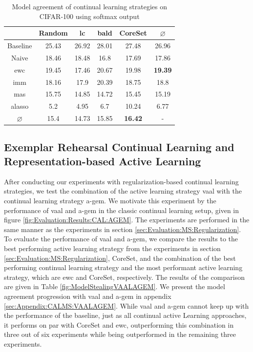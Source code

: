 \begin{table}[h]
    \centering
    \begin{tabular}{ c | c c c c | c } 
         & Random & \gls{lc} & \gls{bald} & CoreSet & $\varnothing$\\ 
        \hline
        Baseline & 25.43 & 26.92 & 28.01 & 27.48 & 26.96 \\
        \hline
        Naive & 18.46 & 18.48 & 16.8 & 17.69 & 17.86\\
        \gls{ewc} & 19.45 & 17.46 & 20.67 & 19.98 & \textbf{19.39}\\
        \gls{imm} & 18.16 & 17.9 & 20.39 & 18.75 & 18.8\\
        \gls{mas} & 15.75 & 14.85 & 14.72 & 15.45 & 15.19\\
        \gls{alasso} & 5.2 & 4.95 & 6.7 & 10.24 & 6.77\\
        \hline
        $\varnothing$ & 15.4 & 14.73 & 15.85 & \textbf{16.42} & -\\
    \end{tabular}
    \caption{Model agreement of continual learning strategies on CIFAR-100 using softmax output}
    \label{fig:ModelStealingCIFAR100Softmax}
\end{table}



\subsection{Exemplar Rehearsal Continual Learning and Representation-based Active Learning}
\label{sec:Evaluation:CALMS:VAAL_AGEM}

After conducting our experiments with regularization-based continual learning strategies, we test the combination of the active learning strategy \gls{vaal}
with the continual learning strategy \gls{a-gem}. We motivate this experiment by the performance of \gls{vaal} and \gls{a-gem} in the classic continual
learning setup, given in figure \ref{fig:Evaluation:Results:CAL:AGEM}. The experiments are performed in the same manner as the experiments in section 
\ref{sec:Evaluation:MS:Regularization}. To evaluate the performance of \gls{vaal} and \gls{a-gem}, we compare the results to the best performing active learning strategy
from the experiments in section \ref{sec:Evaluation:MS:Regularization}, CoreSet, and the combination of the best
performing continual learning strategy and the most performant active learning strategy, which are \gls{ewc} and CoreSet, respectively. The results of the
comparison are given in Table \ref{fig:ModelStealingVAALAGEM}. We present the model agreement progression with \gls{vaal} and \gls{a-gem} in appendix
\ref{sec:Appendix:CALMS:VAALAGEM}. While \gls{vaal} and \gls{a-gem} cannot keep up with the performance of the baseline, just as all continual active Learning approaches,
it performs on par with CoreSet and \gls{ewc}, outperforming this combination in three out of six experiments while being outperformed in the remaining three experiments. \par

